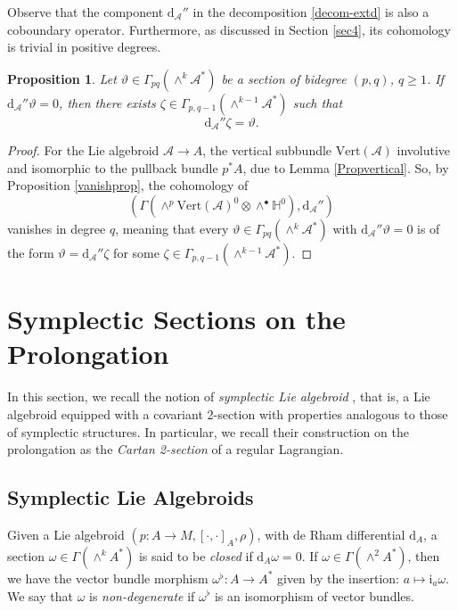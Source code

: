 \documentclass[12pt,letterpaper]{article}
\newcommand{\A}{\mathscr{A}}
\newtheorem{remark}[theorem]{Remark}
\newtheorem{proposition}[theorem]{Proposition}
\numberwithin{equation}{section}
\begin{document}
Observe that the component $\mathrm{d}_\mathscr{A}''$ in the decomposition \eqref{decom-extd} is also a coboundary operator.
Furthermore, as discussed in Section \ref{sec4}, its cohomology is trivial in positive degrees.

\begin{proposition}\label{poincare_lemma}
Let $\vartheta\in \Gamma_{pq}(\wedge^k \mathscr{A}^* )$ be a section of bidegree $(p,q)$, $q\geq1$. 
If $\mathrm{d}_\mathscr{A}''\vartheta=0$, then there exists $\zeta\in \Gamma_{p,q-1}(\wedge^{k-1} \mathscr{A}^*)$ such that
$$ \mathrm{d}_\mathscr{A}'' \zeta = \vartheta. $$
\end{proposition}
\begin{proof}
For the Lie algebroid $\A\to A$, the vertical subbundle $\mathrm{Vert}(\A)$ involutive
and isomorphic to the pullback bundle $p^*A$, due to Lemma \ref{Propvertical}.
So, by Proposition \ref{vanishprop}, the cohomology of 
$$(\Gamma(\wedge^p\mathrm{Vert}(\mathscr{A})^{0}\otimes\wedge^\bullet\mathbb{H}^0),\mathrm{d}_\mathscr{A}'')$$ 
vanishes in degree $q$, meaning that every $\vartheta\in \Gamma_{pq}(\wedge^k \mathscr{A}^*)$ with $\mathrm{d}_\mathscr{A}''\vartheta=0$
is of the form $\vartheta = \mathrm{d}_\mathscr{A}'' \zeta$ for some $\zeta\in \Gamma_{p,q-1}(\wedge^{k-1} \mathscr{A}^*)$.
\end{proof}



\section{Symplectic Sections on the Prolongation}\label{sec:symp}

In this section, we recall the notion of \emph{symplectic Lie algebroid} \cite{deLeonEtAl2005}, 
that is, a Lie algebroid equipped with a covariant 2-section with properties analogous to those of symplectic structures.
In particular, we recall their construction on the prolongation as the \emph{Cartan 2-section} of a regular Lagrangian.

\subsection{Symplectic Lie Algebroids}

Given a Lie algebroid $(p: A\to M, [\cdot ,\cdot]_A, \rho)$, with de Rham differential $\mathrm{d}_A$,
a section $\omega \in \Gamma(\wedge^k A^* )$ is said to be \emph{closed} if $\mathrm{d}_A\omega =0 $.
If $\omega \in \Gamma(\wedge^2 A^*)$, then we have the vector bundle morphism $\omega^\flat: A \rightarrow A^*$ 
given by the insertion: $a \mapsto \mathrm{i}_a\omega$. 
We say that $\omega$ is \emph{non-degenerate} if $\omega^\flat$ is an isomorphism of vector bundles.
\end{document}
